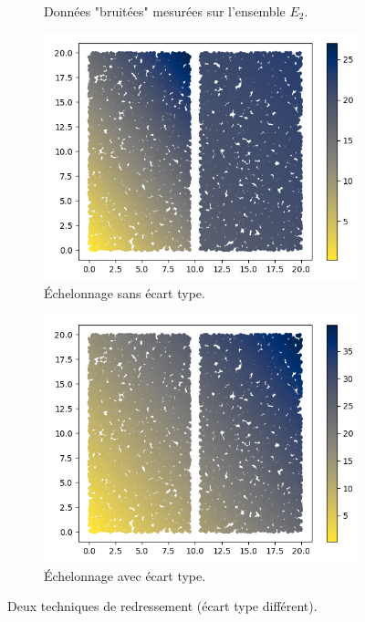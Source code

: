 \documentclass[12pt]{article}
\begin{document}
\begin{figure}[ht!]
\begin{subfigure}[b]{0.475\textwidth}
            {{\small Données "bruitées" mesurées sur l'ensemble $E_2$.}}    
        \end{subfigure}
        \centering
        \begin{subfigure}[b]{0.475\textwidth}
            \centering
            \includegraphics[width=\textwidth]{Images/Frontiere_int2_nostd.png}
            \caption[]%
            {{ \small Échelonnage sans écart type.}}    
        \end{subfigure}
        \hfill
        \begin{subfigure}[b]{0.475\textwidth}  
            \centering 
            \includegraphics[width=\textwidth]{Images/Frontiere_int2_final.png}
            \caption[]%
            {{\small Échelonnage avec écart type.}}    
        \end{subfigure}
        \caption{Deux techniques de redressement (écart type différent).}
    \end{figure}
\end{document}
